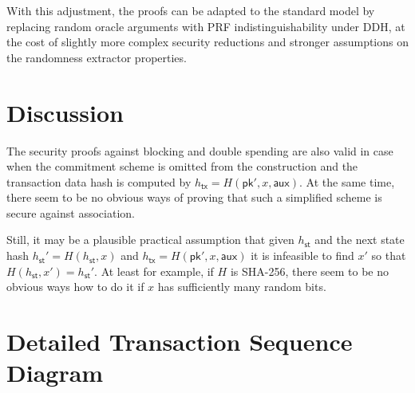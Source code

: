 \documentclass{article}
\newcommand{\pubkey}[0]{\mathsf{pk}}
\newcommand{\sthash}[0]{h_\mathsf{st}}
\newcommand{\txhash}[0]{h_\mathsf{tx}}
\newcommand{\auxd}[0]{\mathsf{aux}}
\begin{document}
With this adjustment, the proofs can be adapted to the standard model by replacing random oracle arguments with PRF indistinguishability under DDH, at the cost of slightly more complex security reductions and stronger assumptions on the randomness extractor properties.


\section{Discussion}

The security proofs against blocking and double spending are also valid in case when the commitment scheme is omitted from the construction and the transaction data hash is computed by $\txhash = H(\pubkey',x,\auxd)$.
At the same time, there seem to be no obvious ways of proving that such a simplified scheme is secure against association.

Still, it may be a plausible practical assumption that given $\sthash$ and the next state hash $\sthash'=H(\sthash,x)$ and $\txhash = H(\pubkey',x,\auxd)$ it is infeasible to find $x'$ so that $H(\sthash,x')=\sthash'$. At least for example, if $H$ is \textsf{SHA-256}, there seem to be no obvious ways how to do it if $x$ has sufficiently many random bits.

\pagebreak
\appendix
\section{Detailed Transaction Sequence Diagram}
\end{document}
